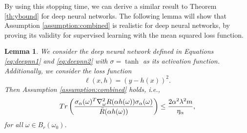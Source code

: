 \documentclass[10pt]{article} %
\newtheorem{lemma}{Lemma}
\begin{document}
    By using this stopping time, we can derive a similar result to Theorem \ref{th:ybound} for deep neural networks. The following lemma will show that Assumption \ref{assumption:combined} is realistic for deep neural networks, by proving its validity for supervised learning with the mean squared loss function. 
    \begin{lemma}\label{lemma:dnn}
        We consider the deep neural network defined in Equations \ref{eq:deepnn1} and  \ref{eq:deepnn2} with $\sigma=\tanh$ as its activation function. Additionally, we consider the loss function 
        $$\ell(x,h)=(y-h(x))^2.$$
        Then Assumption \ref{assumption:combined} holds, i.e., 
        $$Tr\left(\frac{\sigma_\alpha(\omega)^T\nabla_\omega^2R(\alpha h(\omega))\sigma_\alpha(\omega)}{\Bar{R}(\alpha h(\omega))}\right)\leq \frac{2\alpha^2\lambda^2m}{\eta_\alpha},$$
        for all $\omega\in B_r(\omega_0)$. 
    \end{lemma}
\end{document}
